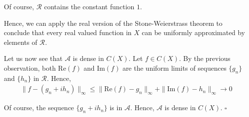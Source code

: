 \documentclass[12pt]{article}
\begin{document}
Of course, $\mathcal{R}$ contains the constant function $1$.

Hence, we can apply the real version of the Stone-Weierstrass theorem to conclude that every real valued function in $X$ can be uniformly approximated by elements of $\mathcal{R}$. 

Let us now see that $\mathcal{A}$ is dense in $C(X)$. Let $f \in C(X)$. By the previous observation, both $\mathrm{Re}(f)$ and $\mathrm{Im}(f)$ are the uniform limits of sequences $\{g_n\}$ and $\{h_n\}$ in $\mathcal{R}$. Hence,
\begin{align*}
\|f - (g_n+ih_n)\|_{\infty} \leq \|\mathrm{Re}(f)-g_n\|_{\infty} + \|\mathrm{Im}(f)-h_n\|_{\infty} \longrightarrow 0
\end{align*}

Of course, the sequence $\{g_n + i h_n\}$ is in $\mathcal{A}$. Hence, $\mathcal{A}$ is dense in $C(X)$. $\square$
\end{document}
